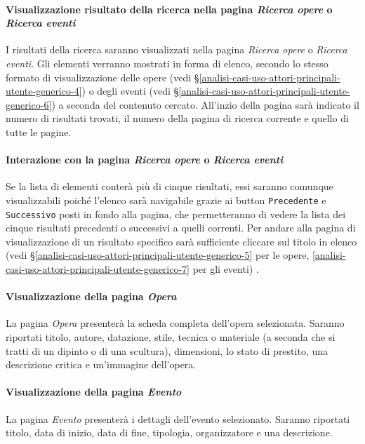 \paragraph{Visualizzazione risultato della ricerca nella pagina \textit{Ricerca opere} o \textit{Ricerca eventi}}
\label{analisi-casi-uso-attori-principali-utente-generico-13}
I risultati della ricerca saranno visualizzati nella pagina \textit{Ricerca opere} o  \textit{Ricerca eventi}. Gli elementi verranno mostrati in forma di elenco, secondo lo stesso formato di visualizzazione delle opere (vedi §\ref{analisi-casi-uso-attori-principali-utente-generico-4}) o degli eventi (vedi §\ref{analisi-casi-uso-attori-principali-utente-generico-6}) a seconda del contenuto cercato. All'inzio della pagina sarà indicato il numero di risultati trovati, il numero della pagina di ricerca corrente e quello di tutte le pagine.


\paragraph{Interazione con la pagina  \textit{Ricerca opere} o \textit{Ricerca eventi}}
\label{analisi-casi-uso-attori-principali-utente-generico-14}
Se la lista di elementi conterà più di cinque risultati, essi saranno comunque visualizzabili poiché l'elenco sarà navigabile grazie ai button \texttt{Precedente} e \texttt{Successivo} posti in fondo alla pagina, che permetteranno di vedere la lista dei cinque risultati precedenti o successivi a quelli correnti. Per andare alla pagina di visualizzazione di un risultato specifico sarà sufficiente cliccare sul titolo in elenco (vedi §\ref{analisi-casi-uso-attori-principali-utente-generico-5} per le opere, \ref{analisi-casi-uso-attori-principali-utente-generico-7} per gli eventi) .


\paragraph{Visualizzazione della pagina \textit{Opera}}
\label{analisi-casi-uso-attori-principali-utente-generico-15}
La pagina \textit{Opera} presenterà la scheda completa dell'opera selezionata. Saranno riportati titolo, autore, datazione, stile, tecnica o materiale (a seconda che si tratti di un dipinto o di una scultura), dimensioni, lo stato di prestito, una descrizione critica e un'immagine dell'opera.


\paragraph{Visualizzazione della pagina \textit{Evento}}
\label{analisi-casi-uso-attori-principali-utente-generico-16}
La pagina \textit{Evento} presenterà i dettagli dell'evento selezionato. Saranno riportati titolo, data di inizio, data di fine, tipologia, organizzatore e una descrizione.


